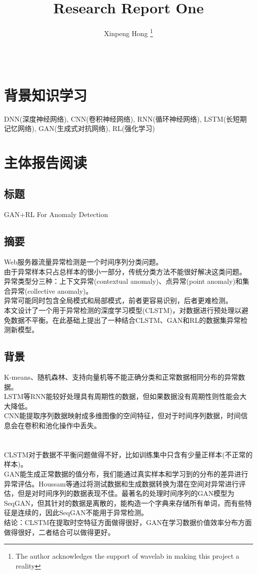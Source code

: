 \documentclass[11pt,a4paper]{ctexart}
\title{Research Report One}
\author{Xinpeng Hong
	\thanks{The author acknowledges the support of wavelab in
		making this project a reality}\\
	\\\\
}
\begin{document}
\makecover
\maketitle
	
\section{背景知识学习}
\noindent DNN(深度神经网络), CNN(卷积神经网络), RNN(循环神经网络), LSTM(长短期记忆网络), GAN(生成式对抗网络), RL(强化学习)

\section{主体报告阅读}
\subsection{标题}
\noindent GAN+RL For Anomaly Detection
\subsection{摘要}
\noindent Web服务器流量异常检测是一个时间序列分类问题。\\
由于异常样本只占总样本的很小一部分，传统分类方法不能很好解决这类问题。\\
异常类型分三种：上下文异常(contextual anomaly)、点异常(point anomaly)和集合异常(collective anomaly)。\\
异常可能同时包含全局模式和局部模式，前者更容易识别，后者更难检测。\\
本文设计了一个用于异常检测的深度学习模型(CLSTM)，对数据进行预处理以避免数据不平衡。在此基础上提出了一种结合CLSTM、GAN和RL的数据集异常检测新模型。
\subsection{背景}
\noindent K-means、随机森林、支持向量机等不能正确分类和正常数据相同分布的异常数据。\\
LSTM等RNN能较好处理具有周期性的数据，但如果数据没有周期性则性能会大大降低。\\
CNN能提取序列数据映射成多维图像的空间特征，但对于时间序列数据，时间信息会在卷积和池化操作中丢失。\\\\	\\
CLSTM对于数据不平衡问题做得不好，比如训练集中只含有少量正样本(不正常的样本)。\\
GAN能生成正常数据的值分布，我们能通过真实样本和学习到的分布的差异进行异常评估。Houssam等通过将测试数据和生成数据转换为潜在空间对异常进行评估，但是对时间序列的数据表现不佳。最著名的处理时间序列的GAN模型为SeqGAN，但其针对的数据是离散的，能构造一个字典来存储所有单词，而有些特征是连续的，因此SeqGAN不能用于异常检测。\\
结论：CLSTM在提取时空特征方面做得很好，GAN在学习数据价值效率分布方面做得很好，二者结合可以做得更好。
\end{document}
